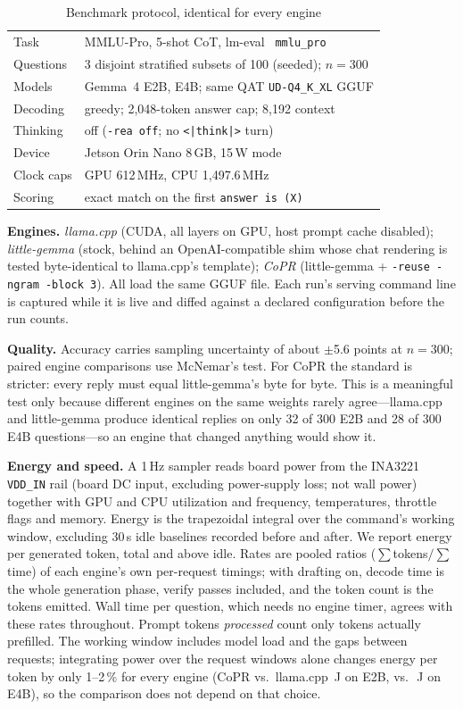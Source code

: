 \documentclass[conference]{IEEEtran}
\newcommand{\sys}{CoPR}
\newcommand{\lc}{llama.cpp}
\newcommand{\lgm}{little-gemma}
\begin{document}
\begin{table}[t]
\caption{Benchmark protocol, identical for every engine}
\label{tab:protocol}
\centering\footnotesize
\begin{tabular}{@{}ll@{}}
\toprule
Task & MMLU-Pro, 5-shot CoT, lm-eval~\cite{lmeval} \texttt{mmlu\_pro} \\
Questions & 3 disjoint stratified subsets of 100 (seeded); $n{=}300$ \\
Models & Gemma~4 E2B, E4B; same QAT \texttt{UD-Q4\_K\_XL} GGUF \\
Decoding & greedy; 2{,}048-token answer cap; 8{,}192 context \\
Thinking & off (\texttt{-rea off}; no \texttt{<|think|>} turn) \\
Device & Jetson Orin Nano 8\,GB, 15\,W mode \\
Clock caps & GPU 612\,MHz, CPU 1{,}497.6\,MHz \\
Scoring & exact match on the first \texttt{answer is (X)} \\
\bottomrule
\end{tabular}
\end{table}

\textbf{Engines.} \emph{\lc{}} (CUDA, all layers on GPU, host prompt cache
disabled); \emph{\lgm{}} (stock, behind an OpenAI-compatible shim whose chat
rendering is tested byte-identical to \lc{}'s template); \emph{\sys{}} (\lgm{}
+ \texttt{-reuse -ngram -block 3}). All load the same GGUF file. Each run's
serving command line is captured while it is live and diffed against a declared
configuration before the run counts.

\textbf{Quality.} Accuracy carries sampling uncertainty of about $\pm$5.6
points at $n{=}300$; paired engine comparisons use McNemar's test. For \sys{}
the standard is stricter: every reply must equal \lgm{}'s byte for byte. This
is a meaningful test only because different engines on the same weights rarely
agree---\lc{} and \lgm{} produce identical replies on only 32 of 300 E2B and
28 of 300 E4B questions---so an engine that changed anything would show it.

\textbf{Energy and speed.} A 1\,Hz sampler reads board power from the INA3221
\texttt{VDD\_IN} rail (board DC input, excluding power-supply loss; not wall
power) together with GPU and CPU utilization and frequency, temperatures,
throttle flags and memory. Energy is the trapezoidal integral over the
command's working window, excluding 30\,s idle baselines recorded before and
after. We report energy per generated token, total and above idle. Rates are
pooled ratios ($\sum$tokens$/\sum$time) of each engine's own per-request
timings; with drafting on, decode time is the whole generation phase, verify
passes included, and the token count is the tokens emitted. Wall time per
question, which needs no engine timer, agrees with these rates throughout.
Prompt tokens \emph{processed} count only tokens actually prefilled.
The working window
includes model load and the gaps between requests; integrating power over the
request windows alone changes energy per token by only 1--2\,\% for every
engine (\sys{} \RwEtwoA{} vs.\ \lc{} \RwEtwoL\,J on E2B, \RwEfourA{} vs.\
\RwEfourL\,J on E4B), so the comparison does not depend on that choice.
\end{document}
